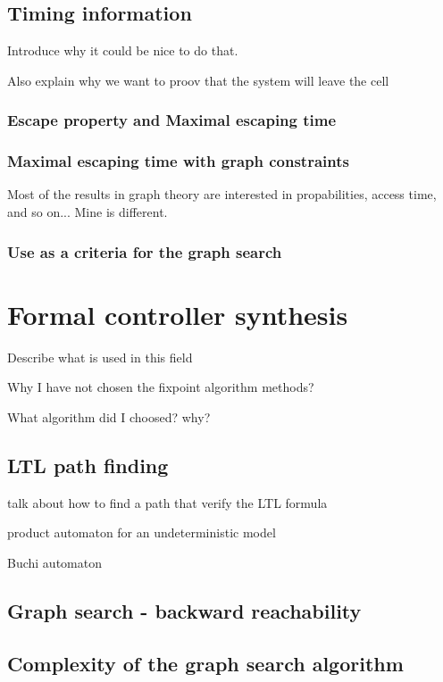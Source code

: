\documentclass[notitlepage]{article}
\theoremstyle{named}
\begin{document}
\subsection{Timing information}
Introduce why it could be nice to do that.

Also explain why we want to proov that the system will leave the cell

\subsubsection{Escape property and Maximal escaping time}

\subsubsection{Maximal escaping time with graph constraints}
Most of the results in graph theory are interested in propabilities, access time, and so on... Mine is different.

\subsubsection{Use as a criteria for the graph search}


\section{Formal controller synthesis}
Describe what is used in this field

Why I have not chosen the fixpoint algorithm methods?

What algorithm did I choosed?
why?

\subsection{LTL path finding}
talk about how to find a path that verify the LTL formula

product automaton for an undeterministic model

Buchi automaton

\subsection{Graph search - backward reachability}

\subsection{Complexity of the graph search algorithm}
\end{document}
